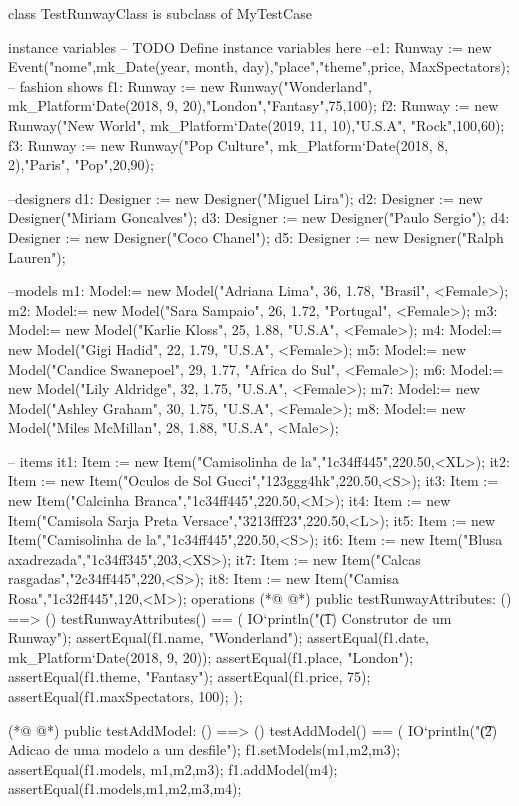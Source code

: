 \begin{vdmpp}[breaklines=true]
class TestRunwayClass is subclass of MyTestCase

instance variables
-- TODO Define instance variables here
 --e1: Runway := new Event("nome",mk_Date(year, month, day),"place","theme",price, MaxSpectators);
 -- fashion shows
 f1: Runway := new Runway("Wonderland", mk_Platform`Date(2018, 9, 20),"London","Fantasy",75,100);
 f2: Runway := new Runway("New World", mk_Platform`Date(2019, 11, 10),"U.S.A", "Rock",100,60);
 f3: Runway := new Runway("Pop Culture", mk_Platform`Date(2018, 8, 2),"Paris", "Pop",20,90);
 
 --designers
 d1: Designer := new Designer("Miguel Lira");
 d2: Designer := new Designer("Miriam Goncalves");
 d3: Designer := new Designer("Paulo Sergio");
 d4: Designer := new Designer("Coco Chanel");
 d5: Designer := new Designer("Ralph Lauren");
 
 --models
 m1: Model:= new Model("Adriana Lima", 36, 1.78, "Brasil", <Female>);
 m2: Model:= new Model("Sara Sampaio", 26, 1.72, "Portugal", <Female>);
 m3: Model:= new Model("Karlie Kloss", 25, 1.88, "U.S.A", <Female>);
 m4: Model:= new Model("Gigi Hadid", 22, 1.79, "U.S.A", <Female>);
 m5: Model:= new Model("Candice Swanepoel", 29, 1.77, "Africa do Sul", <Female>);
 m6: Model:= new Model("Lily Aldridge", 32, 1.75, "U.S.A", <Female>);
 m7: Model:= new Model("Ashley Graham", 30, 1.75, "U.S.A", <Female>);
 m8: Model:= new Model("Miles McMillan", 28, 1.88, "U.S.A", <Male>);
 
 -- items
 it1: Item := new Item("Camisolinha de la","1c34ff445",220.50,<XL>);
 it2: Item := new Item("Oculos de Sol Gucci","123ggg4hk",220.50,<S>);
 it3: Item := new Item("Calcinha Branca","1c34ff445",220.50,<M>);
 it4: Item := new Item("Camisola Sarja Preta Versace","3213fff23",220.50,<L>);
 it5: Item := new Item("Camisolinha de la","1c34ff445",220.50,<S>);
 it6: Item := new Item("Blusa axadrezada","1c34ff345",203,<XS>);
 it7: Item := new Item("Calcas rasgadas","2c34ff445",220,<S>);
 it8: Item := new Item("Camisa Rosa","1c32ff445",120,<M>);
operations
(*@
\label{testRunwayAttributes:38}
@*)
 public testRunwayAttributes: () ==> ()
 testRunwayAttributes() == (
  IO`println("\t (1) Construtor de um Runway");
  assertEqual(f1.name, "Wonderland");
  assertEqual(f1.date, mk_Platform`Date(2018, 9, 20));
  assertEqual(f1.place, "London");
  assertEqual(f1.theme, "Fantasy");
  assertEqual(f1.price, 75);
  assertEqual(f1.maxSpectators, 100);
 );
 
(*@
\label{testAddModel:49}
@*)
 public testAddModel: () ==> ()
 testAddModel() == (
  IO`println("\t (2) Adicao de uma modelo a um desfile");
    f1.setModels({m1,m2,m3});
    assertEqual(f1.models, {m1,m2,m3});
    f1.addModel(m4);
    assertEqual(f1.models,{m1,m2,m3,m4});
 

\end{vdmpp}
